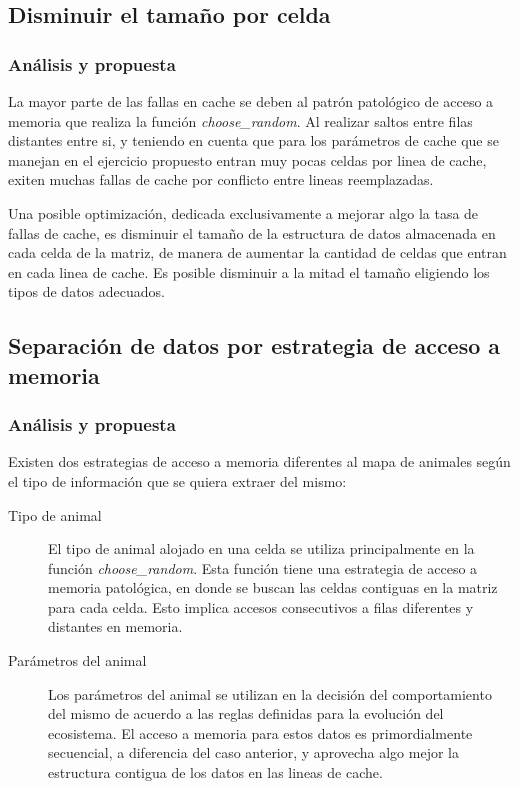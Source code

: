 \documentclass[a4paper,11pt]{article}
\begin{document}
\subsection{Disminuir el tamaño por celda}

\subsubsection{Análisis y propuesta}

La mayor parte de las fallas en cache se deben al patrón patológico de acceso a
memoria que realiza la función \textit{choose\_random}. Al realizar saltos
entre filas distantes entre si, y teniendo en cuenta que para los parámetros de
cache que se manejan en el ejercicio propuesto entran muy pocas celdas por
linea de cache, exiten muchas fallas de cache por conflicto entre lineas
reemplazadas.

Una posible optimización, dedicada exclusivamente a mejorar algo la tasa de
fallas de cache, es disminuir el tamaño de la estructura de datos almacenada en
cada celda de la matriz, de manera de aumentar la cantidad de celdas que entran
en cada linea de cache. Es posible disminuir a la mitad el tamaño eligiendo los
tipos de datos adecuados.

\subsection{Separación de datos por estrategia de acceso a memoria}

\subsubsection{Análisis y propuesta}

Existen dos estrategias de acceso a memoria diferentes al mapa de animales según el tipo de información que se quiera extraer del mismo:

\begin{description}

    \item[Tipo de animal] El tipo de animal alojado en una celda se utiliza
        principalmente en la función \textit{choose\_random}. Esta función
        tiene una estrategia de acceso a memoria patológica, en donde se buscan
        las celdas contiguas en la matriz para cada celda. Esto implica accesos
        consecutivos a filas diferentes y distantes en memoria.

    \item[Parámetros del animal] Los parámetros del animal se utilizan en la
        decisión del comportamiento del mismo de acuerdo a las reglas definidas
        para la evolución del ecosistema. El acceso a memoria para estos datos
        es primordialmente secuencial, a diferencia del caso anterior, y
        aprovecha algo mejor la estructura contigua de los datos en las lineas
        de cache.

\end{description}
\end{document}
